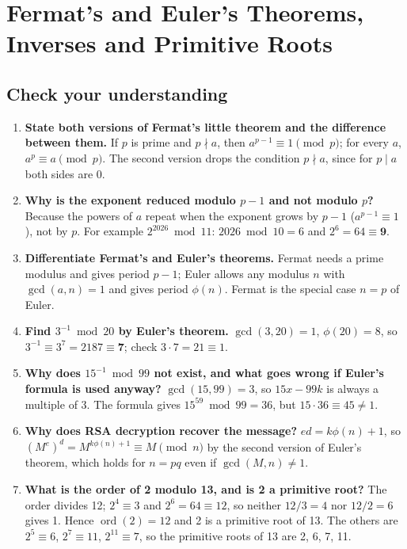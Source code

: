 \section{Fermat's and Euler's Theorems, Inverses and Primitive Roots}\label{q:11_fermat_euler}

\subsection*{Check your understanding}
\begin{enumerate}[leftmargin=1.5em]
  \item \textbf{State both versions of Fermat's little theorem and the difference between them.} If $p$ is prime and $p \nmid a$, then $a^{p-1} \equiv 1 \pmod p$; for every $a$, $a^p \equiv a \pmod p$. The second version drops the condition $p \nmid a$, since for $p \mid a$ both sides are 0.
  \item \textbf{Why is the exponent reduced modulo $p - 1$ and not modulo $p$?} Because the powers of $a$ repeat when the exponent grows by $p - 1$ ($a^{p-1} \equiv 1$), not by $p$. For example $2^{2026} \bmod 11$: $2026 \bmod 10 = 6$ and $2^6 = 64 \equiv \mathbf{9}$.
  \item \textbf{Differentiate Fermat's and Euler's theorems.} Fermat needs a prime modulus and gives period $p - 1$; Euler allows any modulus $n$ with $\gcd(a, n) = 1$ and gives period $\phi(n)$. Fermat is the special case $n = p$ of Euler.
  \item \textbf{Find $3^{-1} \bmod 20$ by Euler's theorem.} $\gcd(3, 20) = 1$, $\phi(20) = 8$, so $3^{-1} \equiv 3^7 = 2187 \equiv \mathbf{7}$; check $3 \cdot 7 = 21 \equiv 1$.
  \item \textbf{Why does $15^{-1} \bmod 99$ not exist, and what goes wrong if Euler's formula is used anyway?} $\gcd(15, 99) = 3$, so $15x - 99k$ is always a multiple of 3. The formula gives $15^{59} \bmod 99 = 36$, but $15 \cdot 36 \equiv 45 \ne 1$.
  \item \textbf{Why does RSA decryption recover the message?} $ed = k\phi(n) + 1$, so $(M^e)^d = M^{k\phi(n)+1} \equiv M \pmod n$ by the second version of Euler's theorem, which holds for $n = pq$ even if $\gcd(M, n) \ne 1$.
  \item \textbf{What is the order of 2 modulo 13, and is 2 a primitive root?} The order divides 12; $2^4 \equiv 3$ and $2^6 = 64 \equiv 12$, so neither $12/3 = 4$ nor $12/2 = 6$ gives 1. Hence $\operatorname{ord}(2) = 12$ and 2 is a primitive root of 13. The others are $2^5 \equiv 6$, $2^7 \equiv 11$, $2^{11} \equiv 7$, so the primitive roots of 13 are 2, 6, 7, 11.

\end{enumerate}
